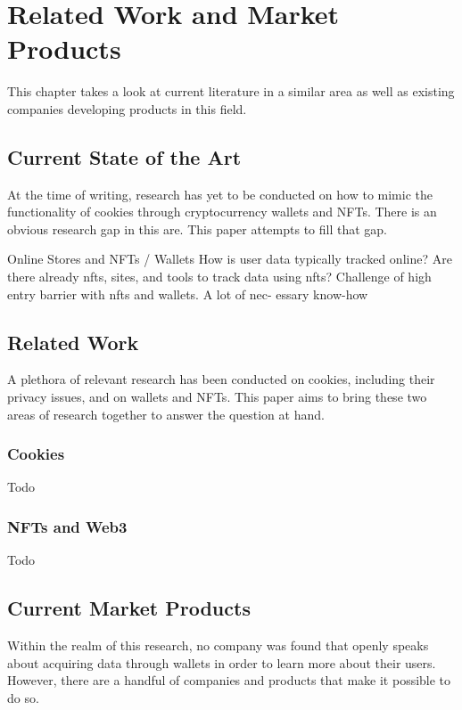 \chapter{Related Work and Market Products}
\label{ch:SOTA}
This chapter takes a look at current literature in a similar area as well as existing companies developing products in this field.

%
%
\section{Current State of the Art}
\label{sec:sota:stateOfTheArt}
At the time of writing, research has yet to be conducted on how to mimic the functionality of cookies through cryptocurrency wallets and NFTs. There is an obvious research gap in this are. This paper attempts to fill that gap. 

Online Stores and NFTs / Wallets
How is user data typically tracked online? 
Are there already nfts, sites, and tools to track data using nfts? 
Challenge of high entry barrier with nfts and wallets. A lot of nec- essary know-how 


%
%
\section{Related Work}
\label{sec:sota:relatedWork}
A plethora of relevant research has been conducted on cookies, including their privacy issues, and on wallets and NFTs. This paper aims to bring these two areas of research together to answer the question at hand.

\subsection{Cookies}
\label{sec:sota:cookies}
Todo

\subsection{NFTs and Web3}
\label{sec:sota:nfts}
Todo



%
%
\section{Current Market Products}
\label{sec:sota:products}
Within the realm of this research, no company was found that openly speaks about acquiring data through wallets in order to learn more about their users. However, there are a handful of companies and products that make it possible to do so.

